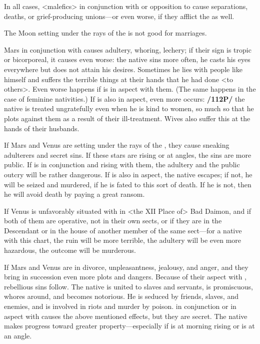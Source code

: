 In all cases, <malefics> in conjunction with or opposition to \Venus\xspace cause separations, deaths, or grief-producing unions—or even worse, if they afflict the \Moon\xspace as well.

The Moon setting under the rays of the \Sun\xspace is not good for marriages. 

Mars in conjunction with \Mercury\xspace causes adultery, whoring, lechery; if their sign is tropic or bicorporeal, it causes even worse: the native sins more often, he casts his eyes everywhere but does not attain his desires. Sometimes he lies with people like himself and suffers the terrible things at their hands that he had done <to others>. Even
worse happens if \Mercury\xspace is in aspect with them. (The same happens in the case of feminine nativities.) If \Saturn\xspace is also in aspect, even more occurs: \textbf{/112P/} the native is treated ungratefully even when he is kind to women, so much so that he plots against them as a result of their ill-treatment. Wives also suffer this at the hands of their husbands.

If Mars and Venus are setting under the rays of the \Sun, they cause sneaking adulterers and secret sins.
If these stars are rising or at angles, the sins are more public. If \Mercury\xspace is in conjunction and rising with
them, the adultery and the public outcry will be rather dangerous. If \Jupiter\xspace is also in aspect, the native
escapes; if not, he will be seized and murdered, if he is fated to this sort of death. If he is not, then he will
avoid death by paying a great ransom. 

If Venus is unfavorably situated with \Mars\xspace in <the XII Place of> Bad Daimon, and if both of them are operative, not in their own sects, or if they are in the Descendant or in the house of another member of the same sect—for a native with this chart, the ruin will be more terrible,
the adultery will be even more hazardous, the outcome will be murderous. 

If Mars and Venus are in divorce, unpleasantness, jealousy, and anger, and they bring in succession even more plots and dangers. Because of their aspect with \Mercury, rebellious sins follow. The native is united to slaves and servants, is promiscuous, whores around, and becomes notorious. He is seduced by friends, slaves, and enemies, and is involved in riots and murder by poison.
\Jupiter\xspace in conjunction or in aspect with \Venus\xspace causes the above mentioned effects, but they are secret. The native makes progress toward greater property—especially if \Jupiter\xspace is at morning rising or is at an angle.

